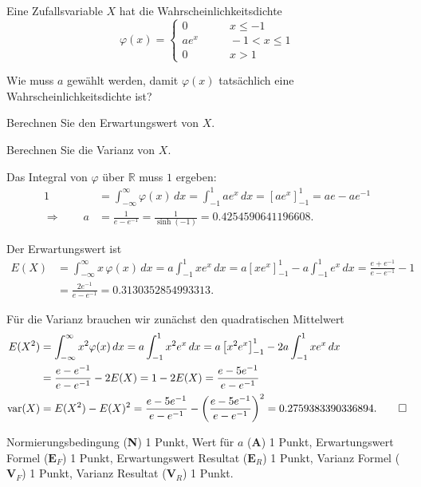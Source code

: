 Eine Zufallsvariable $X$ hat die Wahrscheinlichkeitsdichte
\[
\varphi(x)=\begin{cases}
0&\qquad x\le -1\\
ae^x&\qquad -1<x\le 1\\
0&\qquad x > 1
\end{cases}
\]
\begin{teilaufgaben}
\item Wie muss $a$ gewählt werden, damit $\varphi(x)$ tatsächlich eine
Wahrscheinlichkeitsdichte ist?
\item Berechnen Sie den Erwartungswert von $X$.
\item Berechnen Sie die Varianz von $X$.
\end{teilaufgaben}


\begin{loesung}
\begin{teilaufgaben}
\item
Das Integral von $\varphi$ über $\mathbb R$ muss $1$ ergeben:
\begin{align*}
1
&=
\int_{-\infty}^{\infty} \varphi(x)\,dx
=
\int_{-1}^1ae^x\,dx
=
\left[ae^x\right]_{-1}^1
=
ae-ae^{-1}
\\
\Rightarrow\qquad
a&=\frac1{e-e^{-1}}=\frac1{\sinh(-1)}
=
0.4254590641196608.
\end{align*}
\item
Der Erwartungswert ist
\begin{align*}
E(X)
&=
\int_{-\infty}^\infty x\,\varphi(x)\,dx
=
a\int_{-1}^1xe^x\,dx
=
a\left[xe^x\right]_{-1}^1-a\int_{-1}^1e^x\,dx
=
\frac{e+e^{-1}}{e-e^{-1}}-1
\\
&=
\frac{2e^{-1}}{e-e^{-1}}
=
0.3130352854993313.
\end{align*}
\item
Für die Varianz brauchen wir zunächst den quadratischen Mittelwert
\begin{align*}
E(X^2)
&=
\int_{-\infty}^\infty x^2\varphi(x)\, dx
=
a\int_{-1}^1 x^2e^x\,dx
=
a\left[x^2e^x\right]_{-1}^1
-
2a\int_{-1}^1xe^x\,dx
\\
&=
\frac{e-e^{-1}}{e-e^{-1}}
-2E(X)
=
1-2E(X)
=
\frac{e-5e^{-1}}{e-e^{-1}}
\\
\operatorname{var}(X)
&=
E(X^2)-E(X)^2
=
\frac{e-5e^{-1}}{e-e^{-1}}
-
\biggl(
\frac{e-5e^{-1}}{e-e^{-1}}
\biggr)^2
=
0.2759383390336894.
\qedhere
\end{align*}
\end{teilaufgaben}
\end{loesung}

\begin{bewertung}
Normierungsbedingung ({\bf N}) 1 Punkt,
Wert für $a$ ({\bf A}) 1 Punkt,
Erwartungswert Formel ($\textbf{E}_F$) 1 Punkt,
Erwartungswert Resultat ($\textbf{E}_R$) 1 Punkt,
Varianz Formel ($\textbf{V}_F$) 1 Punkt,
Varianz Resultat ($\textbf{V}_R$) 1 Punkt.
\end{bewertung}





